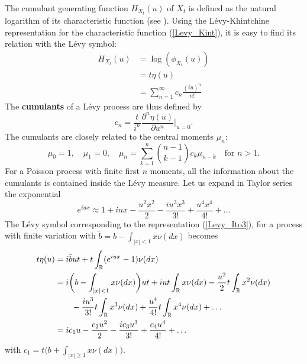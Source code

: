 The cumulant generating function $H_{X_t}(u)$ of $X_t$ is defined as the natural logarithm of its characteristic function
(see \cite{Cont}). 
Using the Lévy-Khintchine representation for the characteristic function (\ref{Levy_Kint}), it is easy to find its relation with
the Lévy symbol:
\begin{align}
H_{X_t}(u) &= \log(\phi_{X_t}(u)) \\ \nonumber
           &= t \eta(u) \\ \nonumber
           &= \sum_{n=1}^{\infty} c_n \frac{(iu)^n}{n!}
\end{align}
The \textbf{cumulants} of a Lévy process are thus defined by
\begin{equation}\label{cumulants}
 c_n = \frac{t}{i^n} \frac{\partial^n \eta(u) }{\partial u^{n}} \biggr|_{u=0} .
\end{equation}
The cumulants are closely related to the central moments $\mu_n$: 
\begin{equation}\label{moment_cumulants}
 \mu_0 = 1,\hspace{1em} \mu_1=0, \hspace{1em} \mu_n=\sum_{k=1}^n \binom{n-1}{k-1}  c_k \mu_{n-k} \hspace{1em} \mbox{for } n>1.  
\end{equation}
For a Poisson process with finite first $n$ moments, all the information about the cumulants is contained inside the Lévy measure.
Let us expand in Taylor series the exponential 
$$ e^{iux} \approx 1 +iux - \frac{u^2x^2}{2} -\frac{iu^3x^3}{3!} +\frac{u^4x^4}{4!} + \dots $$ 
The Lévy symbol corresponding to the representation (\ref{Levy_Ito3}), for a process
with finite variation with $\tilde b = b - \int_{|x|<1} x \nu(dx)$
becomes
\begin{align}\label{cumulant_expansion}
 t \eta(u) &= i\tilde b u t + t \int_{\mathbb{R}} (e^{iux} -1) \nu(dx) \\ \nonumber
          &= i\biggl( b-\int_{|x|<1} x \nu(dx) \biggr)ut +iu t\int_{\mathbb{R}} x \nu(dx) - \frac{u^2}{2}t\int_{\mathbb{R}}x^2 \nu(dx) \\ \nonumber 
          & \hspace{2em} -\frac{iu^3}{3!}t\int_{\mathbb{R}} x^3 \nu(dx) +\frac{u^4}{4!}t\int_{\mathbb{R}} x^4 \nu(dx) + \dots\\ \nonumber
	  &= ic_1 u -\frac{c_2u^2}{2} -\frac{ic_3u^3}{3!} + \frac{c_4u^4}{4!} + \dots 
\end{align}
with $c_1= t \bigl( b+\int_{|x|\geq 1} x \nu(dx) \bigr)$.



